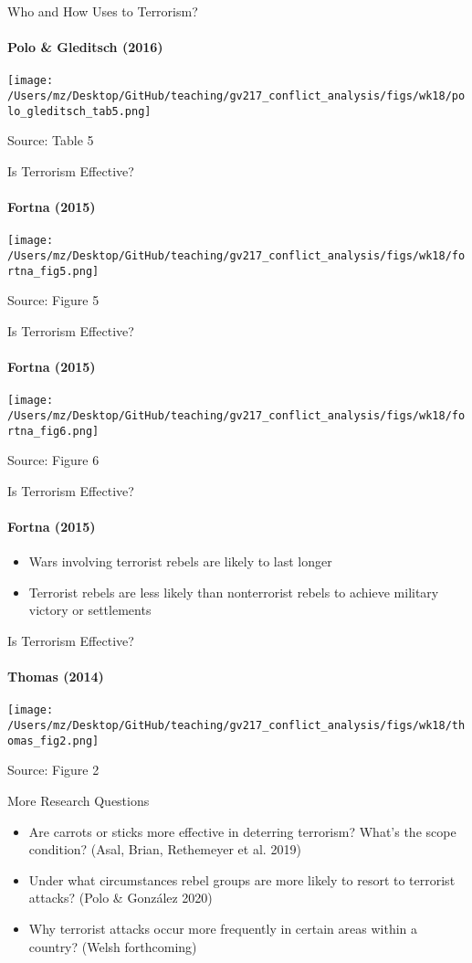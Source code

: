 \documentclass{beamer}
\begin{document}
\begin{frame}{Who and How Uses to Terrorism?}
\framesubtitle{Polo \& Gleditsch (2016)}
    \begin{center}
        \texttt{[image: /Users/mz/Desktop/GitHub/teaching/gv217\_conflict\_analysis/figs/wk18/polo\_gleditsch\_tab5.png]}
    \end{center}
    \footnotesize Source: Table 5
\end{frame}

\begin{frame}{Is Terrorism Effective?}
\framesubtitle{Fortna (2015)}
    \begin{center}
        \texttt{[image: /Users/mz/Desktop/GitHub/teaching/gv217\_conflict\_analysis/figs/wk18/fortna\_fig5.png]}
    \end{center}
    \footnotesize Source: Figure 5
\end{frame}

\begin{frame}{Is Terrorism Effective?}
\framesubtitle{Fortna (2015)}
    \begin{center}
        \texttt{[image: /Users/mz/Desktop/GitHub/teaching/gv217\_conflict\_analysis/figs/wk18/fortna\_fig6.png]}
    \end{center}
    \footnotesize Source: Figure 6
\end{frame}

\begin{frame}{Is Terrorism Effective?}
\framesubtitle{Fortna (2015)}
    \begin{itemize}
        \pause\item Wars involving terrorist rebels are likely to last longer
        \pause\item Terrorist rebels are less likely than nonterrorist rebels to achieve military victory or settlements
    \end{itemize}
\end{frame}

\begin{frame}{Is Terrorism Effective?}
\framesubtitle{Thomas (2014)}
    \begin{center}
        \texttt{[image: /Users/mz/Desktop/GitHub/teaching/gv217\_conflict\_analysis/figs/wk18/thomas\_fig2.png]}
    \end{center}
    \footnotesize Source: Figure 2
\end{frame}

\begin{frame}{More Research Questions}
    \begin{itemize}
        \pause\item Are carrots or sticks more effective in deterring terrorism? What's the scope condition? (Asal, Brian, Rethemeyer et al. 2019)
        \pause\item Under what circumstances rebel groups are more likely to resort to terrorist attacks? (Polo \& González 2020)
        \pause\item Why terrorist attacks occur more frequently in certain areas within a country? (Welsh forthcoming)
    \end{itemize}
\end{frame}
\end{document}
